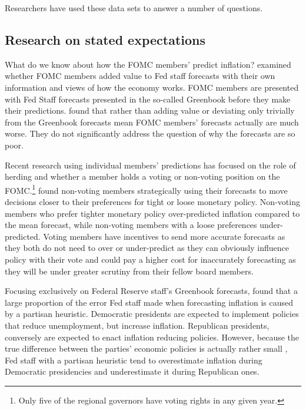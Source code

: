 \documentclass[a4paper]{article}\usepackage{graphicx, color}
\begin{document}
Researchers have used these data sets to answer a number of questions. 

\subsection{Research on stated expectations}

What do we know about how the FOMC members' predict inflation? \cite{RomerRomer2008} examined whether FOMC members added value to Fed staff forecasts with their own information and views of how the economy works. FOMC members are presented with Fed Staff forecasts presented in the so-called Greenbook before they make their predictions. \cite{RomerRomer2008} found that rather than adding value or deviating only trivially from the Greenbook forecasts mean FOMC members' forecasts actually are much worse. They do not significantly address the question of why the forecasts are so poor.

Recent research using individual members' predictions has focused on the role of herding and whether a member holds a voting or non-voting position on the FOMC.\footnote{Only five of the regional governors have voting rights in any given year.} \cite{Tillmann2011} found non-voting members strategically using their forecasts to move decisions closer to their preferences for tight or loose monetary policy. Non-voting members who prefer tighter monetary policy over-predicted inflation compared to the mean forecast, while non-voting members with a loose preferences under-predicted. Voting members have incentives to send more accurate forecasts as they both do not need to over or under-predict as they can obviously influence policy with their vote and could pay a higher cost for inaccurately forecasting as they will be under greater scrutiny from their fellow board members.

Focusing exclusively on Federal Reserve staff's Greenbook forecasts, \cite{gandrud2013does} found that a large proportion of the error Fed staff made when forecasting inflation is caused by a partisan heuristic. Democratic presidents are expected to implement policies that reduce unemployment, but increase inflation. Republican presidents, conversely are expected to enact inflation reducing policies. However, because the true difference between the parties' economic policies is actually rather small \citep{Bartels2008}, Fed staff with a partisan heuristic tend to overestimate inflation during Democratic presidencies and underestimate it during Republican ones.
\end{document}
